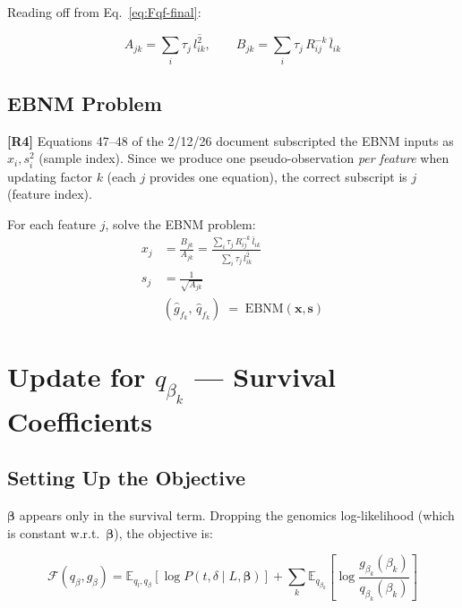 \documentclass[11pt]{article}
\newcommand{\lbar}[2]{\bar{l}_{#1#2}}
\newcommand{\lsec}[2]{\overline{l^2_{#1#2}}}
\begin{document}
Reading off from Eq.~\eqref{eq:Fqf-final}:

\begin{equation}\label{eq:AB-F}
  A_{jk} = \sum_i \tau_j\,\lsec{i}{k},
  \qquad
  B_{jk} = \sum_i \tau_j\,R^{-k}_{ij}\,\lbar{i}{k}
\end{equation}

\subsection{EBNM Problem}

\begin{correctionbox}
\textbf{[R4]} Equations 47--48 of the 2/12/26 document subscripted the EBNM
inputs as $x_i, s^2_i$ (sample index).  Since we produce one pseudo-observation
\emph{per feature} when updating factor $k$ (each $j$ provides one equation),
the correct subscript is $j$ (feature index).
\end{correctionbox}

\begin{ebnmbox}
For each feature $j$, solve the EBNM problem:
\begin{align}
  x_j &= \frac{B_{jk}}{A_{jk}}
       = \frac{\displaystyle\sum_i \tau_j\,R^{-k}_{ij}\,\lbar{i}{k}}
              {\displaystyle\sum_i \tau_j\,\lsec{i}{k}}
  \label{eq:xj-F}\\[6pt]
  s_j &= \frac{1}{\sqrt{A_{jk}}} \label{eq:sj-F}\\[6pt]
  &(\hat{g}_{f_k},\, \hat{q}_{f_k}) \;=\; \mathrm{EBNM}(\mathbf{x}, \mathbf{s})
\end{align}
\end{ebnmbox}

\section{Update for $q_{\beta_k}$ --- Survival Coefficients}
\label{sec:beta}

\subsection{Setting Up the Objective}

$\bm{\beta}$ appears only in the survival term. Dropping the genomics
log-likelihood (which is constant w.r.t.\ $\bm{\beta}$), the objective is:

\begin{equation}\label{eq:Fqb-setup}
  \mathcal{F}(q_\beta, g_\beta)
  = \mathbb{E}_{q_l, q_\beta}\!\left[\log P(t,\delta \mid L,\bm{\beta})\right]
  + \sum_k \mathbb{E}_{q_{\beta_k}}\!\left[\log\frac{g_{\beta_k}(\beta_k)}{q_{\beta_k}(\beta_k)}\right]
\end{equation}
\end{document}
